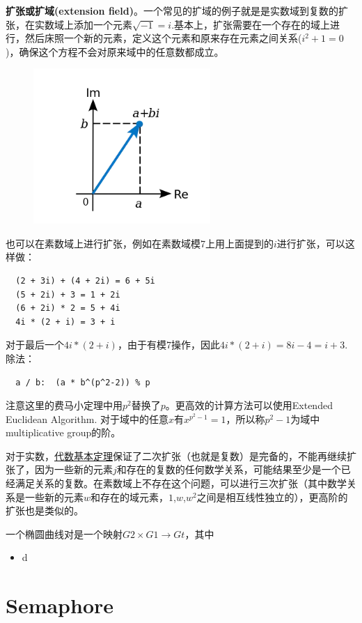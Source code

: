 \documentclass[10pt]{ctexart}
\begin{document}
\textbf{扩张或扩域(extension field)}。一个常见的扩域的例子就是是实数域到复数的扩张，在实数域上添加一个元素$\sqrt{-1}=i$.基本上，扩张需要在一个存在的域上进行，然后床照一个新的元素，定义这个元素和原来存在元素之间关系($i^2 + 1 = 0$)，确保这个方程不会对原来域中的任意数都成立。
\begin{figure}[H]
	\centering
	\includegraphics[width=0.6\textwidth]{img/ExploringEllipticCurvePairings/extension_field.png}
\end{figure}
也可以在素数域上进行扩张，例如在素数域模7上用上面提到的$i$进行扩张，可以这样做：
\begin{lstlisting}
  (2 + 3i) + (4 + 2i) = 6 + 5i
  (5 + 2i) + 3 = 1 + 2i
  (6 + 2i) * 2 = 5 + 4i
  4i * (2 + i) = 3 + i
\end{lstlisting}
对于最后一个$4i * (2 + i)$，由于有模7操作，因此$4i * (2 + i) = 8i - 4 = i + 3$. 除法：
\begin{lstlisting}
  a / b:  (a * b^(p^2-2)) % p
\end{lstlisting}
注意这里的费马小定理中用$p^2$替换了$p$。更高效的计算方法可以使用Extended Euclidean Algorithm. 对于域中的任意$x$有$x^{p^2-1}=1$，所以称$p^2-1$为域中multiplicative group的阶。

对于实数，\href{https://en.wikipedia.org/wiki/Fundamental_theorem_of_algebra}{代数基本定理}保证了二次扩张（也就是复数）是完备的，不能再继续扩张了，因为一些新的元素$j$和存在的复数的任何数学关系，可能结果至少是一个已经满足关系的复数。在素数域上不存在这个问题，可以进行三次扩张（其中数学关系是一些新的元素$w$和存在的域元素，$1$,$w$,$w^2$之间是相互线性独立的），更高阶的扩张也是类似的。

一个椭圆曲线对是一个映射$G2 \times G1 \rightarrow Gt$，其中
\begin{itemize}
	\item d
\end{itemize}

\section{Semaphore}
\end{document}
